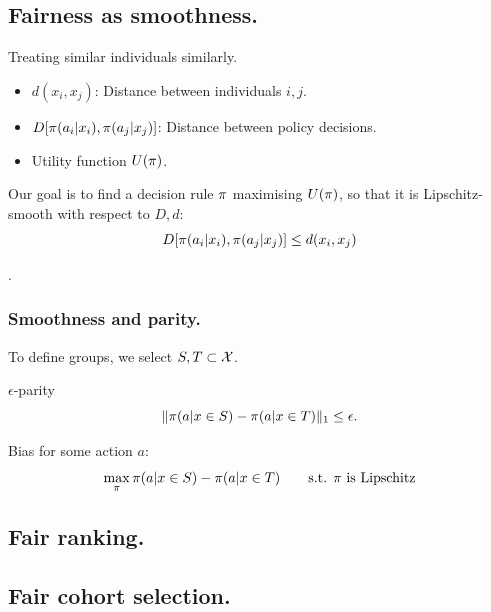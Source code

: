 \subsection{Fairness as smoothness.}
\begin{frame}
  \begin{block}{Treating similar individuals similarly.}
    \begin{itemize}
    \item $d(x_i,x_j)$: Distance between individuals $i,j$.
    \item $D[\pi(a_i | x_i), \pi(a_j | x_j)]$: Distance between policy decisions.
    \item Utility function $U(\pi)$.
    \end{itemize}
    Our goal is to find a decision rule $\pi$ maximising  $U(\pi)$, 
    so that it is Lipschitz-smooth with respect to $D, d$:
    \[
      D[\pi(a_i | x_i), \pi(a_j | x_j)] \leq d(x_i,x_j)
    \]
  \end{block}
  .
\end{frame}

\begin{frame}\frametitle{Smoothness and parity.}
  To define groups, we select $S, T \subset {\mathcal{X}}$.
  \begin{definition}{$\epsilon$-parity}
    \[
      \|\pi(a | x \in S) - \pi(a | x \in T)\|_1 \leq \epsilon.
    \]
  \end{definition}

  \begin{definition}{Bias for some action $a$:}
    \[
      \max_\pi \pi(a | x \in S) - \pi(a | x \in T)
      \qquad
      \textrm{s.t. $\pi$ is Lipschitz}
    \]
  \end{definition}
\end{frame}

\subsection{Fair ranking.}

\subsection{Fair cohort selection.}

